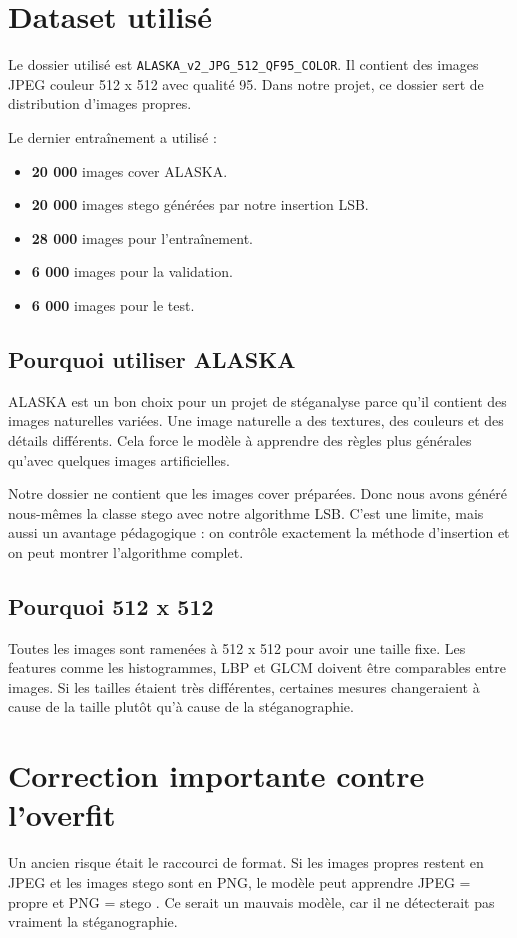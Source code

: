 \documentclass[11pt,a4paper]{article}
\begin{document}
\section{Dataset utilisé}
Le dossier utilisé est \texttt{ALASKA\_v2\_JPG\_512\_QF95\_COLOR}. Il contient des images JPEG couleur 512 x 512 avec qualité 95. Dans notre projet, ce dossier sert de distribution d'images propres.

Le dernier entraînement a utilisé :
\begin{itemize}
  \item \textbf{20 000} images cover ALASKA.
  \item \textbf{20 000} images stego générées par notre insertion LSB.
  \item \textbf{28 000} images pour l'entraînement.
  \item \textbf{6 000} images pour la validation.
  \item \textbf{6 000} images pour le test.
\end{itemize}

\subsection*{Pourquoi utiliser ALASKA}
ALASKA est un bon choix pour un projet de stéganalyse parce qu'il contient des images naturelles variées. Une image naturelle a des textures, des couleurs et des détails différents. Cela force le modèle à apprendre des règles plus générales qu'avec quelques images artificielles.

Notre dossier ne contient que les images cover préparées. Donc nous avons généré nous-mêmes la classe stego avec notre algorithme LSB. C'est une limite, mais aussi un avantage pédagogique : on contrôle exactement la méthode d'insertion et on peut montrer l'algorithme complet.

\subsection*{Pourquoi 512 x 512}
Toutes les images sont ramenées à 512 x 512 pour avoir une taille fixe. Les features comme les histogrammes, LBP et GLCM doivent être comparables entre images. Si les tailles étaient très différentes, certaines mesures changeraient à cause de la taille plutôt qu'à cause de la stéganographie.

\section{Correction importante contre l'overfit}
Un ancien risque était le raccourci de format. Si les images propres restent en JPEG et les images stego sont en PNG, le modèle peut apprendre \og JPEG = propre \fg{} et \og PNG = stego \fg{}. Ce serait un mauvais modèle, car il ne détecterait pas vraiment la stéganographie.
\end{document}
